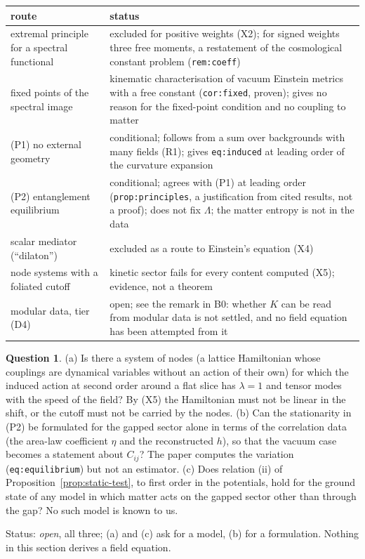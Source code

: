 \documentclass[a4paper,11pt]{article}
\theoremstyle{definition}
\newtheorem{question}[theorem]{Question}
\theoremstyle{remark}
\newcommand{\status}[1]{\par\noindent\textsf{\small Status: #1}\par}
\begin{document}
\begin{center}\small
\begin{tabular}{p{}p{}}
\hline
route & status\\
\hline
extremal principle for a spectral functional & excluded for positive weights (X2); for signed weights three free moments, a restatement of the cosmological constant problem (\texttt{rem:coeff})\\
fixed points of the spectral image & kinematic characterisation of vacuum Einstein metrics with a free constant (\texttt{cor:fixed}, proven); gives no reason for the fixed-point condition and no coupling to matter\\
(P1) no external geometry & conditional; follows from a sum over backgrounds with many fields (R1); gives \texttt{eq:induced} at leading order of the curvature expansion\\
(P2) entanglement equilibrium & conditional; agrees with (P1) at leading order (\texttt{prop:principles}, a justification from cited results, not a proof); does not fix $\Lambda$; the matter entropy is not in the data\\
scalar mediator (``dilaton'') & excluded as a route to Einstein's equation (X4)\\
node systems with a foliated cutoff & kinetic sector fails for every content computed (X5); evidence, not a theorem\\
modular data, tier \textup{(D4)} & open; see the remark in B0: whether $K$ can be read from modular data is not settled, and no field equation has been attempted from it\\
\hline
\end{tabular}
\end{center}

\begin{question}\label{q:b3}
\textup{(a)} Is there a system of nodes (a lattice Hamiltonian whose couplings are dynamical variables without an action of their own) for which the induced action at second order around a flat slice has $\lambda=1$ and tensor modes with the speed of the field? By (X5) the Hamiltonian must not be linear in the shift, or the cutoff must not be carried by the nodes. \textup{(b)} Can the stationarity in (P2) be formulated for the gapped sector alone in terms of the correlation data (the area-law coefficient $\eta$ and the reconstructed $h$), so that the vacuum case becomes a statement about $C_{ij}$? The paper computes the variation (\texttt{eq:equilibrium}) but not an estimator. \textup{(c)} Does relation \textup{(ii)} of Proposition~\ref{prop:static-test}, to first order in the potentials, hold for the ground state of any model in which matter acts on the gapped sector other than through the gap? No such model is known to us.
\end{question}
\status{\emph{open}, all three; (a) and (c) ask for a model, (b) for a formulation. Nothing in this section derives a field equation.}
\end{document}
